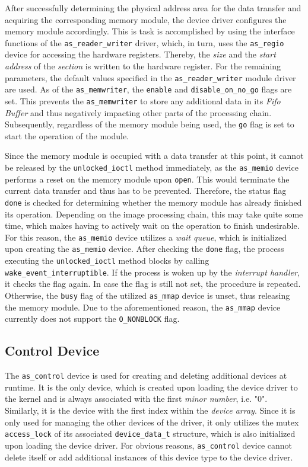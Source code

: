 After successfully determining the physical address area for the data transfer and acquiring the corresponding memory module, the device driver configures the memory module accordingly.
This is task is accomplished by using the interface functions of the \texttt{as\_reader\_writer} driver, which, in turn, uses the \texttt{as\_regio} device for accessing the hardware registers.
Thereby, the \textit{size} and the \textit{start address} of the \textit{section} is written to the hardware register.
For the remaining parameters, the default values specified in the \texttt{as\_reader\_writer} module driver are used.
As of the \texttt{as\_memwriter}, the \texttt{enable} and \texttt{disable\_on\_no\_go} flags are set.
This prevents the \texttt{as\_memwriter} to store any additional data in its \textit{Fifo Buffer} and thus negatively impacting other parts of the processing chain.
Subsequently, regardless of the memory module being used, the \texttt{go} flag is set to start the operation of the module.

Since the memory module is occupied with a data transfer at this point, it cannot be released by the \texttt{unlocked\_ioctl} method immediately, as the \texttt{as\_memio} device performs a reset on the memory module upon \texttt{open}.
This would terminate the current data transfer and thus has to be prevented.
Therefore, the status flag \texttt{done} is checked for determining whether the memory module has already finished its operation.
Depending on the image processing chain, this may take quite some time, which makes having to actively wait on the operation to finish undesirable.
For this reason, the \texttt{as\_memio} device utilizes a \textit{wait queue}, which is initialized upon creating the \texttt{as\_memio} device.
After checking the \texttt{done} flag, the process executing the \texttt{unlocked\_ioctl} method blocks by calling \texttt{wake\_event\_interruptible}.
If the process is woken up by the \textit{interrupt handler}, it checks the flag again.
In case the flag is still not set, the procedure is repeated.
Otherwise, the \texttt{busy} flag of the utilized \texttt{as\_mmap} device is unset, thus releasing the memory module.
Due to the aforementioned reason, the \texttt{as\_mmap} device currently does not support the \texttt{O\_NONBLOCK} flag.


\subsection{Control Device}

The \texttt{as\_control} device is used for creating and deleting additional devices at runtime.
It is the only device, which is created upon loading the device driver to the kernel and is always associated with the first \textit{minor number}, i.e. "0".
Similarly, it is the device with the first index within the \textit{device array}.
Since it is only used for managing the other devices of the driver, it only utilizes the mutex \texttt{access\_lock} of its associated \texttt{device\_data\_t} structure, which is also initialized upon loading the device driver.
For obvious reasons, \texttt{as\_control} device cannot delete itself or add additional instances of this device type to the device driver.

